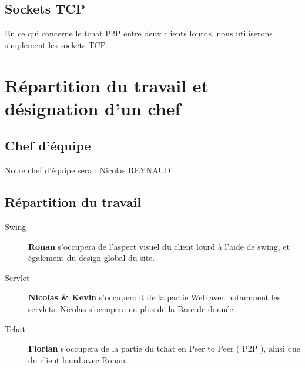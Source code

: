 \documentclass{article}
\begin{document}
\subsection{Sockets TCP}
En ce qui concerne le tchat P2P entre deux clients lourds, nous utiliserons simplement les sockets TCP. 

\newpage
\section{Répartition du travail et désignation d'un chef}
\subsection{Chef d'équipe}
Notre chef d'équipe sera : Nicolas REYNAUD

\subsection{Répartition du travail}

\begin{description}
  \item[Swing] \textbf{Ronan} s'occupera de l'aspect visuel du client lourd à l'aide de swing, et également du design global du site.
  \item[Servlet] \textbf{Nicolas \& Kevin} s’occuperont de la partie Web avec notamment les servlets. Nicolas s'occupera en plus de la Base de donnée.
  \item[Tchat] \textbf{Florian} s'occupera de la partie du tchat en Peer to Peer ( P2P ), ainsi que du client lourd avec Ronan.
\end{description}
\end{document}
